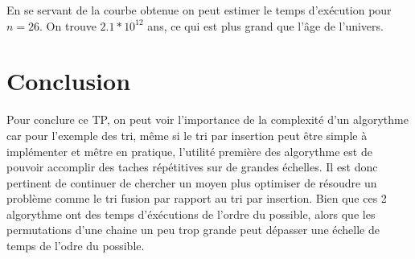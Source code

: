 \documentclass[12pt]{article}
\begin{document}
En se servant de la courbe obtenue on peut estimer le temps d'exécution pour $n=26$. On trouve $2.1*10^{12}$ ans, ce qui est plus grand que l'âge de l'univers.

\newpage
\section{Conclusion}
Pour conclure ce TP, on peut voir l'importance de la complexité d'un algorythme car pour l'exemple des tri, même si le tri par insertion peut être simple à implémenter et mêtre en pratique, l'utilité première des algorythme est de pouvoir accomplir des taches répétitives sur de grandes échelles.
Il est donc pertinent de continuer de chercher un moyen plus optimiser de résoudre un problème comme le tri fusion  par rapport au tri par insertion. Bien que ces 2 algorythme ont des temps d'éxécutions de l'ordre du possible, alors que les permutations d'une chaine un peu trop grande peut dépasser une échelle de temps de l'odre du possible.
\end{document}
